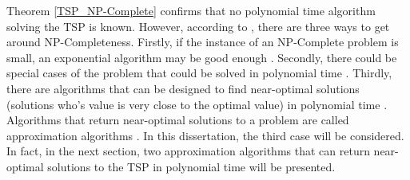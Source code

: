 \documentclass[12pt]{article}
\numberwithin{equation}{subsection}
\numberwithin{table}{subsection}
\numberwithin{algorithm}{subsection}
\numberwithin{figure}{subsection}
\begin{document}
Theorem \ref{TSP_NP-Complete} confirms that no polynomial time algorithm solving the TSP is known. However, according to \cite{cormen_leiserson_rivest_stein}, there are three ways to get around NP-Completeness. Firstly, if the instance of an NP-Complete problem is small, an exponential algorithm may be good enough \cite{cormen_leiserson_rivest_stein}. Secondly, there could be special cases of the problem that could be solved in polynomial time \cite{cormen_leiserson_rivest_stein}. Thirdly, there are algorithms that can be designed to find near-optimal solutions (solutions who's value is very close to the optimal value) in polynomial time \cite{cormen_leiserson_rivest_stein}. Algorithms that return near-optimal solutions to a problem are called approximation algorithms \cite{cormen_leiserson_rivest_stein}. In this dissertation, the third case will be considered. In fact, in the next section, two approximation algorithms that can return near-optimal solutions to the TSP in polynomial time will be presented.
\end{document}
